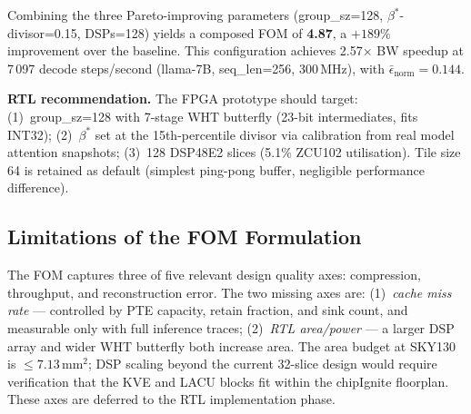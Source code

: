 Combining the three Pareto-improving parameters (group\_sz=128,
$\beta^*$\!-divisor=0.15, DSPs=128) yields a composed FOM of \textbf{4.87},
a $+189\%$ improvement over the baseline.  This configuration achieves
2.57$\times$ BW speedup at 7\,097 decode steps/second (llama-7B,
seq\_len=256, 300\,MHz), with $\bar\epsilon_\text{norm}=0.144$.

\textbf{RTL recommendation.}  The FPGA prototype should target:
(1)~group\_sz=128 with 7-stage WHT butterfly (23-bit intermediates,
fits INT32); (2)~$\beta^*$ set at the 15th-percentile divisor via
calibration from real model attention snapshots; (3)~128 DSP48E2 slices
(5.1\% ZCU102 utilisation).  Tile size 64 is retained as default
(simplest ping-pong buffer, negligible performance difference).

\subsection{Limitations of the FOM Formulation}

The FOM captures three of five relevant design quality axes: compression,
throughput, and reconstruction error.  The two missing axes are:
(1)~\emph{cache miss rate} — controlled by PTE capacity, retain
fraction, and sink count, and measurable only with full inference
traces; (2)~\emph{RTL area/power} — a larger DSP array and wider WHT
butterfly both increase area.  The area budget at SKY130 is
${\le}7.13\,\text{mm}^2$; DSP scaling beyond the current 32-slice
design would require verification that the KVE and LACU blocks fit
within the chipIgnite floorplan.  These axes are deferred to the RTL
implementation phase.
